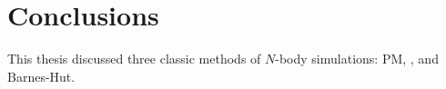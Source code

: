 \chapter{Conclusions} %

This thesis discussed three classic methods of $N$-body simulations: PM, \PThreeM{}, and Barnes-Hut.


